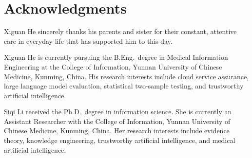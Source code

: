 \documentclass[10pt,journal,compsoc]{IEEEtran}
\begin{document}
\section*{Acknowledgments}
Xiguan He sincerely thanks his parents and sister for their constant, attentive care in everyday life that has supported him to this day.




\vfill
\begin{IEEEbiographynophoto}{Xiguan He}
is currently pursuing the B.Eng.\ degree in Medical Information Engineering at the College of Information, Yunnan University of Chinese Medicine, Kunming, China. His research interests include cloud service assurance, large language model evaluation, statistical two-sample testing, and trustworthy artificial intelligence.
\end{IEEEbiographynophoto}

\begin{IEEEbiographynophoto}{Siqi Li}
received the Ph.D.\ degree in information science. She is currently an Assistant Researcher with the College of Information, Yunnan University of Chinese Medicine, Kunming, China. Her research interests include evidence theory, knowledge engineering, trustworthy artificial intelligence, and medical artificial intelligence.
\end{IEEEbiographynophoto}
\end{document}
